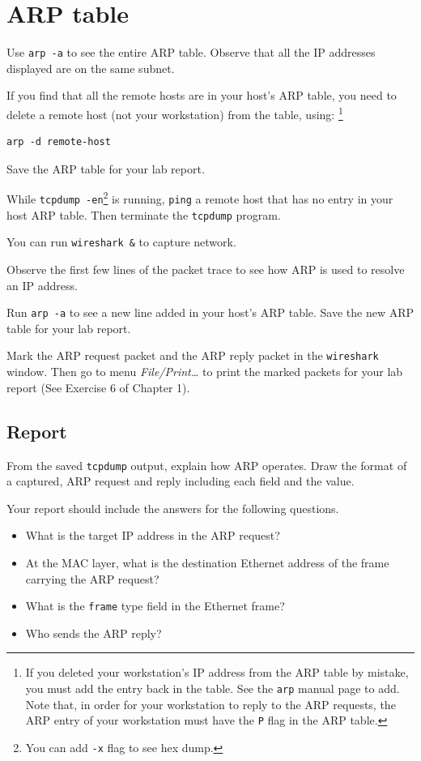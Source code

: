 \documentclass{../UTNetLab}
\begin{document}
\section{ARP table}
    Use \lstinline{arp -a} to see the entire ARP table.
    Observe that all the IP addresses displayed are on the same subnet.

    If you find that all the remote hosts are in your host’s ARP table, you need to delete a remote host (not your workstation) from the table, using:
    \footnote{If you deleted your workstation’s IP address from the ARP table by mistake, you must add the entry back in the table. See the \lstinline{arp} manual page to add.
    Note that, in order for your workstation to reply to the ARP requests, the ARP entry of your workstation must have the \lstinline{P} flag in the ARP table.}
    \begin{lstlisting}[emph={remote-host}]
arp -d remote-host
    \end{lstlisting}

    Save the ARP table for your lab report.

    While \lstinline{tcpdump -en}\footnote{You can add \lstinline{-x} flag to see hex dump.} is running, \lstinline{ping} a remote host that has no entry in your host ARP table.
    Then terminate the \lstinline{tcpdump} program.

    You can run \lstinline{wireshark &} to capture network.

    Observe the first few lines of the packet trace to see how ARP is used to resolve an IP address.

    Run \lstinline{arp -a} to see a new line added in your host’s ARP table.
    Save the new ARP table for your lab report.

    Mark the ARP request packet and the ARP reply packet in the \lstinline{wireshark} window.
    Then go to menu \textit{File/Print\ldots} to print the marked packets for your lab report (See Exercise 6 of Chapter 1).

    \subsection*{Report}
    From the saved \lstinline{tcpdump} output, explain how ARP operates.
    Draw the format of a captured, ARP request and reply including each field and the value.

    Your report should include the answers for the following questions.
    \begin{itemize}
        \item What is the target IP address in the ARP request?
        \item At the MAC layer, what is the destination Ethernet address of the frame carrying the ARP request?
        \item What is the \texttt{frame} type field in the Ethernet frame?
        \item Who sends the ARP reply?
    \end{itemize}
\end{document}
